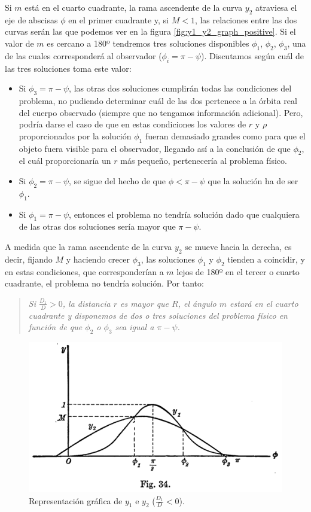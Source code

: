 \documentclass[11pt]{article}
\begin{document}
Si $m$ está en el cuarto cuadrante, la rama ascendente de la curva $y_2$ atraviesa el eje de abscisas $\phi$ en el primer cuadrante y, si $M<1$, las relaciones entre las dos curvas serán las que podemos ver en la figura \ref{fig:y1_y2_graph_positive}. Si el valor de $m$ es cercano a 180º tendremos tres soluciones disponibles $\phi_1$, $\phi_2$, $\phi_3$, una de las cuales corresponderá al observador ($\phi_i=\pi-\psi$). Discutamos según cuál de las tres soluciones toma este valor:
\begin{itemize}
\item Si $\phi_3=\pi-\psi$, las otras dos soluciones cumplirán todas las condiciones del problema, no pudiendo determinar cuál de las dos pertenece a la órbita real del cuerpo observado (siempre que no tengamos información adicional). Pero, podría darse el caso de que en estas condiciones los valores de $r$ y $\rho$ proporcionados por la solución $\phi_1$ fueran demasiado grandes como para que el objeto fuera visible para el observador, llegando así a la conclusión de que $\phi_2$, el cuál proporcionaría un $r$ más pequeño, pertenecería al problema físico.
\item Si $\phi_2=\pi-\psi$, se sigue del hecho de que $\phi<\pi-\psi$ que la solución ha de ser $\phi_1$.
\item Si $\phi_1=\pi-\psi$, entonces el problema no tendría solución dado que cualquiera de las otras dos soluciones sería mayor que $\pi-\psi$.
\end{itemize} 

A medida que la rama ascendente de la curva $y_2$ se mueve hacia la derecha, es decir, fijando $M$ y haciendo crecer $\phi_3$, las soluciones $\phi_1$ y $\phi_2$ tienden a coincidir, y en estas condiciones, que corresponderían a $m$ lejos de 180º en el tercer o cuarto cuadrante, el problema no tendría solución. Por tanto:
\begin{quote}
\textit{Si $\frac{D_1}{D}>0$, la distancia $r$ es mayor que $R$, el ángulo $m$ estará en el cuarto cuadrante y disponemos de dos o tres soluciones del problema físico en función de que $\phi_2$ o $\phi_3$ sea igual a $\pi-\psi$.}\\
\end{quote}

\begin{figure}[H]
\centering
\includegraphics[scale=0.55]{images/fig_34.png}
\caption{Representación gráfica de $y_1$ e $y_2$ ($\frac{D_1}{D}<0$).}
\label{fig:y1_y2_graph_negative}
\end{figure}
\end{document}

